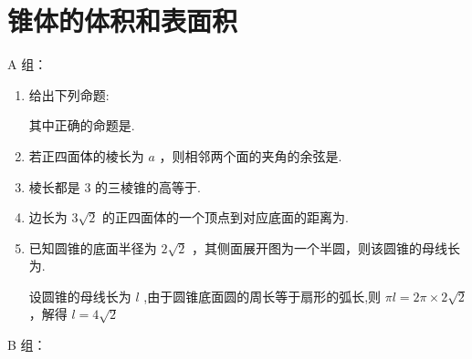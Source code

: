 \section*{锥体的体积和表面积}

A 组：
\begin{enumerate}
    \item 给出下列命题:
    其中正确的命题是.
    
    \item 若正四面体的棱长为 $a$ ，则相邻两个面的夹角的余弦是.
    
    \item 棱长都是 3 的三棱锥的高等于.

    \item 边长为 $3\sqrt{2}$ 的正四面体的一个顶点到对应底面的距离为.
    
    \item 已知圆锥的底面半径为 $2\sqrt{2}$ ，其侧面展开图为一个半圆，则该圆锥的母线长为.
    \begin{jieda}
        设圆锥的母线长为 $l$ ,由于圆锥底面圆的周长等于扇形的弧长,则 ${\pi l} = {2\pi } \times  2\sqrt{2}$，解得 $l = 4\sqrt{2}$
    \end{jieda}
\end{enumerate}

B 组：

